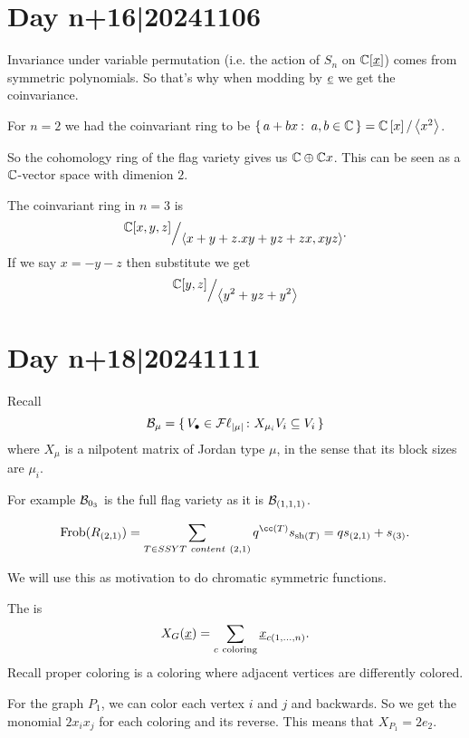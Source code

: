 \documentclass[12pt]{memoir}
\begin{document}
\section{Day n+16|20241106}

Invariance under variable permutation (i.e. the action of $S_n$ on $\mathbb{C}[\underline x]$) comes from symmetric polynomials. So that's why when modding by $\underline e$ we get the coinvariance.

\begin{Ex}
    For $n=2$ we had the coinvariant ring to be $\set{a+bx\:\ a,b\in\bC}=\bC\bonj{x}/\genr{x^2}$.\par
    So the cohomology ring of the flag variety gives us $\mathbb{C}\oplus\mathbb{C} x$. This can be seen as a $\mathbb{C}$-vector space with dimenion $2$.
\end{Ex}

\begin{Ex}
    The coinvariant ring in $n=3$ is 
    $$\quot{\bC[x,y,z]}{\genr{x+y+z.xy+yz+zx,xyz}}.$$
    If we say $x=-y-z$ then substitute we get
    $$\quot{\bC[y,z]}{\genr{y^2+yz+y^2}}$$
\end{Ex}

\section{Day n+18|20241111}

Recall 
$$\cB_\mu=\set{V_\8\in\Fl_{|\mu|}\:\ X_{\mu_i}V_i\subseteq V_i}$$
where $X_\mu$ is a nilpotent matrix of Jordan type $\mu$, in the sense that its block sizes are $\mu_i$.

\begin{Ex}
    For example $\mathcal{B}_{0_3}$ is the full flag variety as it is $\mathcal{B}_{(1,1,1)}$.
\end{Ex}

\begin{Ex}
    $$\Frob(R_{(2,1)})=\sum_{T\in SSYT\ content\ (2,1)}q^{\cc(T)}s_{\sh(T)}=qs_{(2,1)}+s_{(3)}.$$
\end{Ex}

We will use this as motivation to do chromatic symmetric functions. 

\begin{Def}
    The  is 
    $$X_G(\un x)=\sum_{c\ \text{coloring}}\un x_{c(1,\dots,n)}.$$
    Recall proper coloring is a coloring where adjacent vertices are differently colored.
\end{Def}

\begin{Ex}
    For the graph $P_1$, we can color each vertex $i$ and $j$ and backwards. So we get the monomial $2x_ix_j$ for each coloring and its reverse. This means that $X_{P_1}=2e_2$.
\end{Ex}
\end{document}
